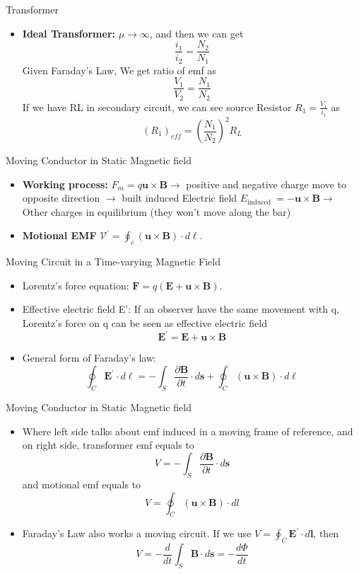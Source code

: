 \documentclass[xcolor={dvipsnames}]{beamer}
\begin{document}
\begin{frame}{Transformer}
\begin{itemize}
	\item \textbf{Ideal Transformer:} $\mu\rightarrow\infty$, and then we can get
	$$\frac{i_{1}}{i_{2}}=\frac{N_{2}}{N_{1}}$$
	Given Faraday’s Law, We get ratio of emf as
	$$\frac{V_{1}}{V_{2}}=\frac{N_{1}}{N_{2}}$$
	If we have RL in secondary circuit, we can see source Resistor $R_1=\frac{V_1}{i_1}$ as
	$$\left(R_{1}\right)_{e f f}=\left(\frac{N_{1}}{N_{2}}\right)^{2} R_{L}$$
\end{itemize}
\end{frame}
\begin{frame}{Moving Conductor in Static Magnetic field}
	\begin{itemize}
		\item \textbf{Working process:} $F_{m}=q \mathbf{u} \times \mathbf{B} \rightarrow$ positive and negative charge move to opposite direction $\rightarrow$ built induced Electric field $E_{\text {induced }}=-\mathbf{u} \times \mathbf{B} \rightarrow$  Other charges in equilibrium (they won’t move along the bar)
		\item \textbf{Motional EMF} $\mathcal{V}^{\prime}=\oint_{c}(\mathbf{u} \times \mathbf{B}) \cdot d \ell$.
	\end{itemize}
\end{frame}
\begin{frame}{Moving Circuit in a Time-varying Magnetic Field}
\begin{itemize}
	\item Lorentz’s force equation: $\mathbf{F}=q(\mathbf{E}+\mathbf{u} \times \mathbf{B})$.
	\item Effective electric field E': If an observer have the same movement with q, Lorentz’s force on q can be seen as effective electric field
	$$\mathbf{E}^{\prime}=\mathbf{E}+\mathbf{u} \times \mathbf{B}$$
	\item General form of Faraday’s law:
	$$\oint_{C} \mathbf{E}^{\prime} \cdot d \ell=-\int_{S} \frac{\partial \mathbf{B}}{\partial t} \cdot d \mathbf{s}+\oint_{C}(\mathbf{u} \times \mathbf{B}) \cdot d \ell$$
	
\end{itemize}
\end{frame}
\begin{frame}{Moving Conductor in Static Magnetic field}
\begin{itemize}
	\item Where left side talks about emf induced in a moving frame of reference, and on right side, transformer emf equals to
	$$V=-\int_{S} \frac{\partial \mathbf{B}}{\partial t} \cdot d \mathbf{s}$$
	and motional emf equals to
	$$V=\oint_{C}(\mathbf{u} \times \mathbf{B}) \cdot d l$$
	\item Faraday’s Law also works a moving circuit. If we use $V=\oint_{C} \mathbf{E}^{\prime} \cdot d \mathbf{l}$, then 
	$$V=-\frac{d}{d t} \int_{S} \mathbf{B} \cdot d \mathbf{s}=-\frac{d \Phi}{d t}$$
\end{itemize}
\end{frame}
\end{document}
